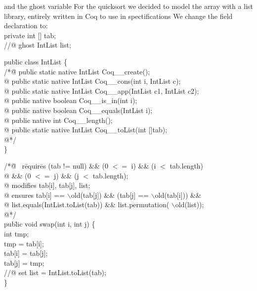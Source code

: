 and the ghost variable
\elist
For the quicksort we decided to model the array with a list
library, entirely written in Coq to use in spectifications
\small
We change the field declaration to:\\
private int [] tab;\\
//@ {\purple ghost IntList list};
\begin{tabbing}

pub\=lic class IntList \{\+\\
	/*\=@ \+public static native IntList Coq\_\_create();\\
	  @ public static native IntList Coq\_\_cons(int i, IntList c);\\
	  @ public static native IntList Coq\_\_app(IntList c1, IntList c2);\\
	  @ public native boolean Coq\_\_is\_in(int i);\\
	  @ public native boolean Coq\_\_equals(IntList i);\\
	  @ public native int Coq\_\_length();\\
	  @ public static native IntList {\purple Coq\_\_toList}(int []tab);\\
	  @*/\-\\
\}
\end{tabbing}
\small
\begin{tabbing}
/*\=@\+ \ {\purple r}\={\purple equir}\={\purple es} (tab != null) \&\& (0 $<=$ i) \&\& (i $<$ tab.length)\\ 
  @ \>\> \&\& (0 $<=$ j) \&\& (j $<$ tab.length);\\
  @ {\purple modifies} tab[i], tab[j], list;\\
  @ {\purple ensures} tab[i] == $\backslash$old(tab[j]) \&\& (tab[j] ==  $\backslash$old(tab[i])) \&\& \\
  @ \>\> list.equals(IntList.toList(tab)) \&\& list.permutation( $\backslash$old(list));\\
  @*/\\
  pub\=lic void swap(int i, int j) \+\{\\
     int tmp;\\
     tmp = tab[i];\\
     tab[i] = tab[j];\\
     tab[j] = tmp;\\
     //@ {\purple set} list = IntList.toList(tab);\-\\
  \}
\end{tabbing}

